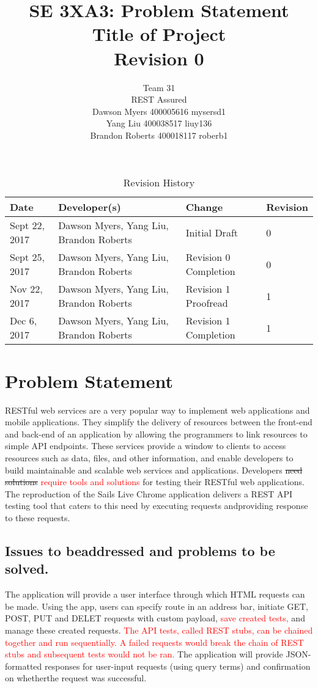 \documentclass{article}
\title{SE 3XA3: Problem Statement\\Title of Project\\Revision 0	}
\author{Team 31
		\\ REST Assured
		\\ Dawson Myers 400005616  mysersd1
		\\ Yang Liu 400038517 liuy136
		\\ Brandon Roberts 400018117 roberb1
}
\date{}
\begin{document}
\begin{table}[hp]
\caption{Revision History} \label{TblRevisionHistory}
\begin{tabularx}{\textwidth}{lXlX}
\toprule
\textbf{Date} & \textbf{Developer(s)} & \textbf{Change} & \textbf{Revision}\\
\midrule
Sept​ ​22,​ ​2017 & Dawson Myers, Yang Liu, Brandon Roberts & Initial Draft & 0\\
\hline
Sept​ ​25,​ ​2017 & Dawson Myers, Yang Liu, Brandon Roberts & Revision​ ​0​ ​Completion & 0\\
\hline
Nov​ ​22,​ ​2017 & Dawson Myers, Yang Liu, Brandon Roberts & Revision​ ​1 Proofread & 1\\
\hline
Dec 6,​ ​2017 & Dawson Myers, Yang Liu, Brandon Roberts & Revision​ ​1 Completion & 1\\
\hline
\bottomrule
\end{tabularx}
\end{table}

\newpage

\maketitle

\newpage
\section{Problem Statement}
RESTful web services are a very popular way to implement web applications and mobile applications. They simplify the delivery of resources between the front-end and back-end of an application by allowing the programmers to link resources to simple API endpoints. These services provide a window to clients to access resources such as data, files, and other information, and enable developers to build maintainable and scalable web services and applications. Developers \sout{need solutions} \textcolor{red}{require tools and solutions} for testing their RESTful web applications. The reproduction of the Sails Live Chrome application delivers a REST API testing tool that caters to this​ ​need​ ​by​ ​executing​ ​requests​ ​and​ ​providing​ ​response​ ​to​ ​these​ ​requests.

\subsection{Issues​ ​to​ ​be​ ​addressed​ ​and​ ​problems​ ​to​ ​be​ ​solved.}

The application will provide a user interface through which HTML requests can be made. Using the app, users can specify route in an address bar, initiate GET, POST, PUT and DELET requests with custom payload, \textcolor{red}{save created tests,} and manage these created requests. \textcolor{red}{The API tests, called REST stubs, can be chained together and run sequentially. A failed requests would break the chain of REST stubs and subsequent tests would not be ran.} The application will provide JSON-formatted responses for user-input requests (using query terms) and confirmation on whether​ ​the​ ​request​ ​was​ ​successful. 
\end{document}
